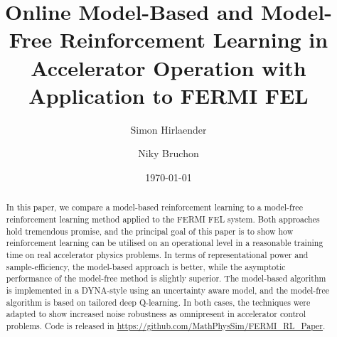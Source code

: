 \documentclass[
reprint,
amsmath,amssymb,amsfonts,clevref,
aps,
prstab,
]{revtex4-2}
\begin{document}
	
	
	
	
	\title{Online Model-Based and Model-Free Reinforcement Learning in Accelerator Operation with Application to FERMI FEL}
	
	
	
	\author{Simon Hirlaender}
	\author{Niky Bruchon}%
	
	\date{\today}%
	
	
	\begin{abstract}
		In this paper, we compare a model-based reinforcement learning to a model-free reinforcement learning method applied to the FERMI FEL system. Both approaches hold tremendous promise, and the principal goal of this paper is to show how reinforcement learning can be utilised on an operational level in a reasonable training time on real accelerator physics problems. In terms of representational power and sample-efficiency, the model-based approach is better, while the asymptotic performance of the model-free method is slightly superior. The model-based algorithm is implemented in a DYNA-style using an uncertainty aware model, and the model-free algorithm is based on tailored deep Q-learning. In both cases, the techniques were adapted to show increased noise robustness as omnipresent in accelerator control problems. Code is released in \url{https://github.com/MathPhysSim/FERMI_RL_Paper}.
		
	\end{abstract}
	\maketitle

\end{document}
